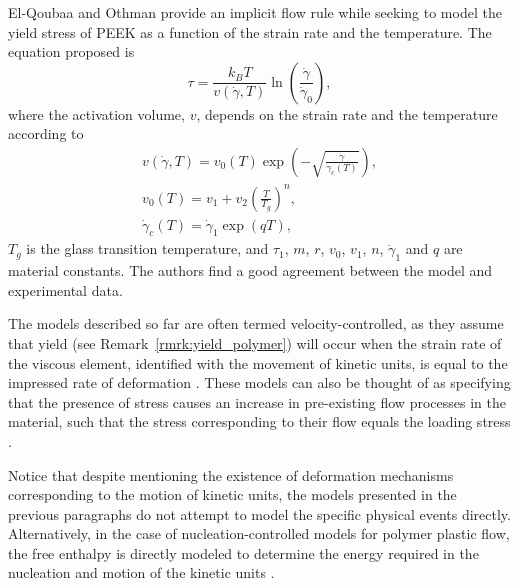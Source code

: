 El-Qoubaa and Othman \citep{el-qoubaaStrainRateSensitivity2016} provide an implicit flow rule while seeking to model the yield stress of PEEK as a function of the strain rate and the temperature.
The equation proposed is
\begin{equation}
	\label{eq:elquobaa_ree_eyring_stress}
	\tau = \frac{k_B T}{v(\dot \gamma, T)}\ln\left(\frac{\dot\gamma}{\dot\gamma_0}\right),
\end{equation}
where the activation volume, $v$, depends on the strain rate and the temperature according to
\begin{gather}
	v(\dot\gamma, T) = v_0(T)\exp\left(-\sqrt{\frac{\dot\gamma}{\dot \gamma_c(T)} }\right),\\
	v_0(T) = v_1 + v_2 \left(\frac{T}{T_g}\right)^n,\\
	\dot \gamma_c (T) = \dot \gamma_1 \exp(q T),
\end{gather}
$T_g$ is the glass transition temperature, and $\tau_1$, $m$, $r$, $v_0$, $v_1$, $n$, $\dot\gamma_1$ and $q$ are material constants.
The authors find a good agreement between the model and experimental data.

The models described so far are often termed velocity-controlled, as they assume that yield (see Remark~\ref{rmrk:yield_polymer}) will occur when the strain rate of the viscous element, identified with the movement of kinetic units, is equal to the impressed rate of deformation \citep{fotheringhamRoleRecoveryForces1978}.
These models can also be thought of as specifying that the presence of stress causes an increase in pre-existing flow processes in the material, such that the stress corresponding to their flow equals the loading stress \citep{wardIntroductionMechanicalProperties2004}.

Notice that despite mentioning the existence of deformation mechanisms corresponding to the motion of kinetic units, the models presented in the previous paragraphs do not attempt to model the specific physical events directly.
Alternatively, in the case of nucleation-controlled models for polymer plastic flow, the free enthalpy is directly modeled to determine the energy required in the nucleation and motion of the kinetic units \citep{fotheringhamRoleRecoveryForces1978, wardIntroductionMechanicalProperties2004}.

